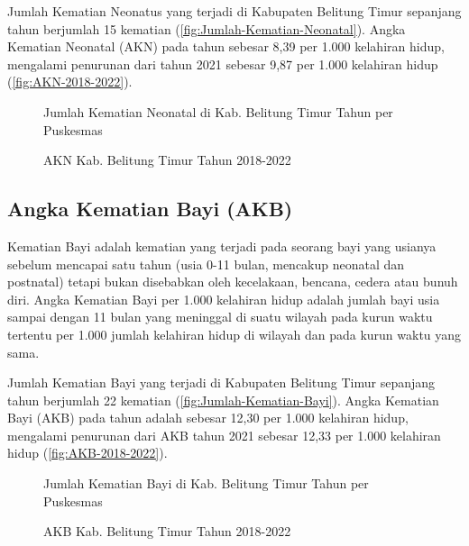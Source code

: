 Jumlah Kematian Neonatus yang terjadi di Kabupaten Belitung Timur sepanjang tahun \tP berjumlah 15 kematian (\autoref{fig:Jumlah-Kematian-Neonatal}). Angka Kematian Neonatal (AKN) pada tahun \tP sebesar 8,39 per 1.000 kelahiran hidup, mengalami penurunan dari tahun 2021 sebesar 9,87 per 1.000 kelahiran hidup (\autoref{fig:AKN-2018-2022}).

\begin{figure}[H]
    \centering{}
    \caption{Jumlah Kematian Neonatal di Kab. Belitung Timur Tahun \tP per Puskesmas}
    \label{fig:Jumlah-Kematian-Neonatal}
\end{figure}

\begin{figure}[H]
    \centering{}
    \caption{AKN Kab. Belitung Timur Tahun 2018-2022}
    \label{fig:AKN-2018-2022}
\end{figure}


\subsection{Angka Kematian Bayi (AKB)}
Kematian Bayi adalah kematian yang terjadi pada seorang bayi yang usianya sebelum mencapai satu tahun (usia 0-11 bulan, mencakup neonatal dan postnatal) tetapi bukan disebabkan oleh kecelakaan, bencana, cedera atau bunuh diri. Angka Kematian Bayi per 1.000 kelahiran hidup adalah jumlah bayi usia sampai dengan 11 bulan yang meninggal di suatu wilayah pada kurun waktu tertentu per 1.000 jumlah kelahiran hidup di wilayah dan pada kurun waktu yang sama.

Jumlah Kematian Bayi yang terjadi di Kabupaten Belitung Timur sepanjang tahun \tP berjumlah 22 kematian (\autoref{fig:Jumlah-Kematian-Bayi}). Angka Kematian Bayi (AKB) pada tahun \tP adalah sebesar 12,30 per 1.000 kelahiran hidup, mengalami penurunan dari AKB tahun 2021 sebesar 12,33 per 1.000 kelahiran hidup (\autoref{fig:AKB-2018-2022}).

\begin{figure}[H]
    \centering{}
    \caption{Jumlah Kematian Bayi di Kab. Belitung Timur Tahun \tP per Puskesmas}
    \label{fig:Jumlah-Kematian-Bayi}
\end{figure}

\begin{figure}[H]
    \centering{}
    \caption{AKB Kab. Belitung Timur Tahun 2018-2022}
    \label{fig:AKB-2018-2022}
\end{figure}


